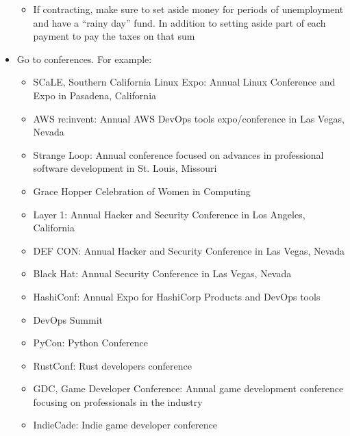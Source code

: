 \documentclass[12pt]{article}
\begin{document}
\begin{itemize}
\begin{itemize}
  \item If contracting, make sure to set aside money for periods of unemployment and have a ``rainy day'' fund.  In addition to setting aside part of each payment to pay the taxes on that sum
  \end{itemize}
\item Go to conferences.  For example:
  \begin{itemize}
  \item SCaLE, Southern California Linux Expo: Annual Linux Conference and Expo in Pasadena, California
  \item AWS re:invent: Annual AWS DevOps tools expo/conference in Las Vegas, Nevada
  \item Strange Loop: Annual conference focused on advances in professional software development in St. Louis, Missouri
  \item Grace Hopper Celebration of Women in Computing
  \item Layer 1: Annual Hacker and Security Conference in Los Angeles, California
  \item DEF CON: Annual Hacker and Security Conference in Las Vegas, Nevada
  \item Black Hat: Annual Security Conference in Las Vegas, Nevada
  \item HashiConf: Annual Expo for HashiCorp Products and DevOps tools
  \item DevOps Summit
  \item PyCon: Python Conference
  \item RustConf: Rust developers conference
  \item GDC, Game Developer Conference: Annual game development conference focusing on professionals in the industry
  \item IndieCade: Indie game developer conference
  \end{itemize}
\end{itemize}
\end{document}
